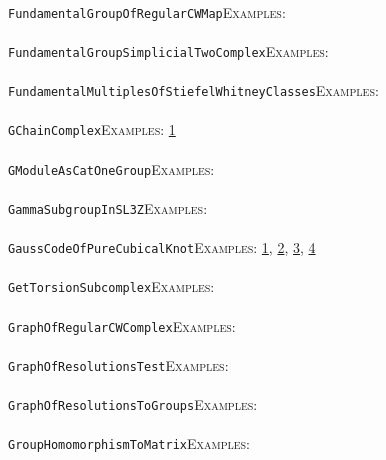 \documentclass[a4paper,11pt]{report}
\begin{document}
{{ \\
 \texttt{FundamentalGroupOfRegularCWMap}{\nobreakspace}{\nobreakspace}{\nobreakspace}{\nobreakspace}\textsc{Examples:} \\
 \\
 \texttt{FundamentalGroupSimplicialTwoComplex}{\nobreakspace}{\nobreakspace}{\nobreakspace}{\nobreakspace}\textsc{Examples:} \\
 \\
 \texttt{FundamentalMultiplesOfStiefelWhitneyClasses}{\nobreakspace}{\nobreakspace}{\nobreakspace}{\nobreakspace}\textsc{Examples:} \\
 \\
 \texttt{GChainComplex}{\nobreakspace}{\nobreakspace}{\nobreakspace}{\nobreakspace}\textsc{Examples:} \href{../www/SideLinks/About/aboutBredon.html} {1}{\nobreakspace} \\
 \\
 \texttt{GModuleAsCatOneGroup}{\nobreakspace}{\nobreakspace}{\nobreakspace}{\nobreakspace}\textsc{Examples:} \\
 \\
 \texttt{GammaSubgroupInSL3Z}{\nobreakspace}{\nobreakspace}{\nobreakspace}{\nobreakspace}\textsc{Examples:} \\
 \\
 \texttt{GaussCodeOfPureCubicalKnot}{\nobreakspace}{\nobreakspace}{\nobreakspace}{\nobreakspace}\textsc{Examples:} \href{tutorial/chap5.html} {1}{\nobreakspace}, \href{../www/SideLinks/About/aboutQuandles2.html} {2}{\nobreakspace}, \href{../www/SideLinks/About/aboutQuandles.html} {3}{\nobreakspace}, \href{../www/SideLinks/About/aboutKnotsQuandles.html} {4}{\nobreakspace} \\
 \\
 \texttt{GetTorsionSubcomplex}{\nobreakspace}{\nobreakspace}{\nobreakspace}{\nobreakspace}\textsc{Examples:} \\
 \\
 \texttt{GraphOfRegularCWComplex}{\nobreakspace}{\nobreakspace}{\nobreakspace}{\nobreakspace}\textsc{Examples:} \\
 \\
 \texttt{GraphOfResolutionsTest}{\nobreakspace}{\nobreakspace}{\nobreakspace}{\nobreakspace}\textsc{Examples:} \\
 \\
 \texttt{GraphOfResolutionsToGroups}{\nobreakspace}{\nobreakspace}{\nobreakspace}{\nobreakspace}\textsc{Examples:} \\
 \\
 \texttt{GroupHomomorphismToMatrix}{\nobreakspace}{\nobreakspace}{\nobreakspace}{\nobreakspace}\textsc{Examples:} \\
}}
\end{document}
